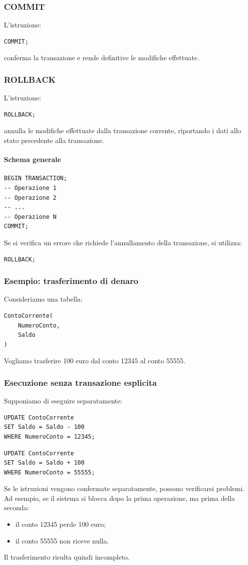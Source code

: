 \subsubsection{COMMIT}
L'istruzione:
\begin{verbatim}
COMMIT;
\end{verbatim}
conferma la transazione e rende definitive
le modifiche effettuate.
\subsubsection{ROLLBACK}
L'istruzione:
\begin{verbatim}
ROLLBACK;
\end{verbatim}
annulla le modifiche effettuate dalla transazione
corrente, riportando i dati allo stato precedente
alla transazione.
\paragraph{Schema generale}
\begin{verbatim}
BEGIN TRANSACTION;
-- Operazione 1
-- Operazione 2
-- ...
-- Operazione N
COMMIT;
\end{verbatim}
Se si verifica un errore che richiede
l'annullamento della transazione, si utilizza:
\begin{verbatim}
ROLLBACK;
\end{verbatim}
\subsubsection{Esempio: trasferimento di denaro}
Consideriamo una tabella:
\begin{verbatim}
ContoCorrente(
    NumeroConto,
    Saldo
)
\end{verbatim}
Vogliamo trasferire 100 euro dal conto 12345
al conto 55555.
\subsubsection{Esecuzione senza transazione esplicita}
Supponiamo di eseguire separatamente:
\begin{verbatim}
UPDATE ContoCorrente
SET Saldo = Saldo - 100
WHERE NumeroConto = 12345;
\end{verbatim}
\begin{verbatim}
UPDATE ContoCorrente
SET Saldo = Saldo + 100
WHERE NumeroConto = 55555;
\end{verbatim}
Se le istruzioni vengono confermate separatamente,
possono verificarsi problemi.
Ad esempio, se il sistema si blocca dopo
la prima operazione, ma prima della seconda:
\begin{itemize}
    \item il conto 12345 perde 100 euro;
    \item il conto 55555 non riceve nulla.
\end{itemize}
Il trasferimento risulta quindi incompleto.

